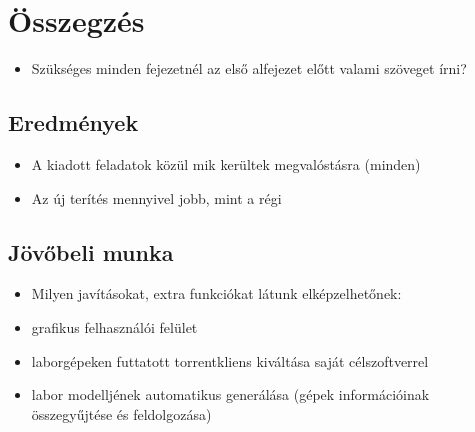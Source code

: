 \chapter{Összegzés}
\label{chp:summary}
\begin{itemize}
  \item Szükséges minden fejezetnél az első alfejezet előtt valami szöveget írni?
\end{itemize}
\section{Eredmények}
\begin{itemize}
  \item A kiadott feladatok közül mik kerültek megvalóstásra (minden)
  \item Az új terítés mennyivel jobb, mint a régi
\end{itemize}
\section{Jövőbeli munka}
\begin{itemize}
  \item Milyen javításokat, extra funkciókat látunk elképzelhetőnek:
  \item grafikus felhasználói felület
  \item laborgépeken futtatott torrentkliens kiváltása saját célszoftverrel
  \item labor modelljének automatikus generálása (gépek információinak összegyűjtése és feldolgozása)
\end{itemize}